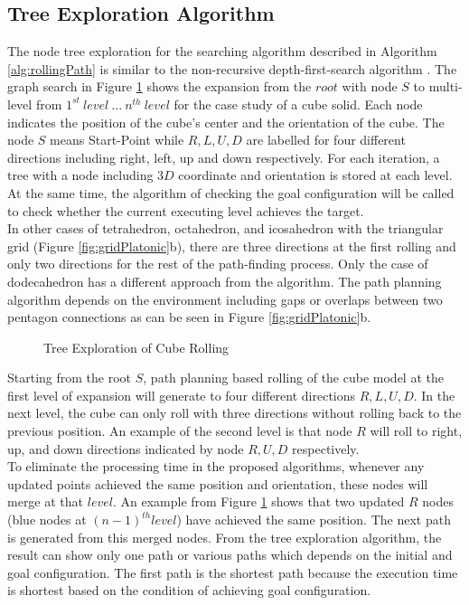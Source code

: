 \subsection{Tree Exploration Algorithm}
The node tree exploration for the searching algorithm described in Algorithm \ref{alg:rollingPath} is similar to the non-recursive depth-first-search algorithm \cite{Tarjan1972_DepthFirstSearch}. The graph search in Figure \ref{fig:nodeTree} shows the expansion from the $root$ with node $S$ to multi-level from $1^{st}\ level\ ...\ n^{th}\ level$ for the case study of a cube solid.
%
Each node indicates the position of the cube's center and the orientation of the cube. The node $S$ means Start-Point while $R,L,U,D$ are labelled for four different directions including right, left, up and down respectively. 
%
For each iteration, a tree with a node including $3D$ coordinate and orientation is stored at each level. At the same time, the algorithm of checking the goal configuration will be called to check whether the current executing level achieves the target.\\


\noindent In other cases of tetrahedron, octahedron, and icosahedron with the triangular grid (Figure \ref{fig:gridPlatonic}b), there are three directions at the first rolling and only two directions for the rest of the path-finding process.
%
Only the case of dodecahedron has a different approach from the algorithm. The path planning algorithm depends on the environment including gaps or overlaps between two pentagon connections as can be seen in Figure \ref{fig:gridPlatonic}b.
%
\vskip 0.5cm
\begin{figure}[h]
	
	\caption{Tree Exploration of Cube Rolling}
\label{fig:nodeTree}
\end{figure}

\noindent Starting from the root $S$, path planning based rolling of the cube model at the first level of expansion will generate to four different directions $R,L,U,D$. In the next level, the cube can only roll with three directions without rolling back to the previous position.  
An example of the second level is that node $R$ will roll to right, up, and down directions indicated by node $R,U,D$ respectively.\\
% 

\noindent To eliminate the processing time in the proposed algorithms, whenever any updated points achieved the same position and orientation, these nodes will merge at that $level$. An example from Figure \ref{fig:nodeTree} shows that two updated $R$ nodes (blue nodes at $(n-1)^{th} level$) have achieved the same position. The next path is generated from this merged nodes. 
%
From the tree exploration algorithm, the result can show only one path or various paths which depends on the initial and goal configuration. The first path is the shortest path because the execution time is shortest based on the condition of achieving goal configuration.
% 
%	
%
\clearpage
\newpage